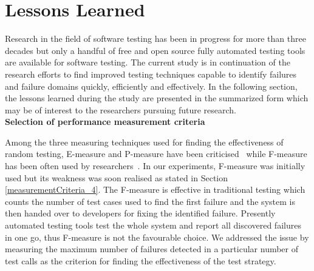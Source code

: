 \newpage
\section{Lessons Learned}
Research in the field of software testing has been in progress for more than three decades but only a handful of free and open source fully automated testing tools are available for software testing. The current study is in continuation of the research efforts to find improved testing techniques capable to identify failures and failure domains quickly, efficiently and effectively. In the following section, the lessons learned during the study are presented in the summarized form which may be of interest to the researchers pursuing future research.\\

  
    









\textbf{Selection of performance measurement criteria}

Among the three measuring techniques used for finding the effectiveness of random testing, E-measure and P-measure have been criticised~\cite{chen2005adaptive} while F-measure has been often used by researchers~\cite{chen2004statistical, chen1996expected}. In our experiments, F-measure was initially used but its weakness was soon realised as stated in Section \ref{measurementCriteria_4}. The F-measure is effective in traditional testing which counts the number of test cases used to find the first failure and the system is then handed over to developers for fixing the identified failure. Presently automated testing tools test the whole system and report all discovered failures in one go, thus F-measure is not the favourable choice. We addressed the issue by measuring the maximum number of failures detected in a particular number of test calls as the criterion for finding the effectiveness of the test strategy.\\

